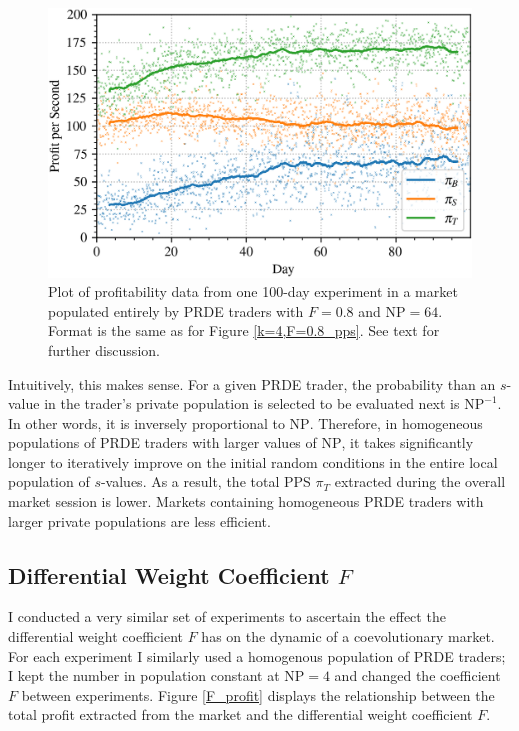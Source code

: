\documentclass[conference]{IEEEtran}
\begin{document}
\begin{figure}[htbp]
    \centerline{\includegraphics[width=\columnwidth]{k=64,F=0.8_pps.png}}
    \caption{
        Plot of profitability data from one 100-day experiment in a market populated entirely by PRDE traders with $F=0.8$ and $\mathrm{NP}=64$.
        Format is the same as for Figure \ref{k=4,F=0.8_pps}.
        See text for further discussion.
    }
    \label{k=64,F=0.8_pps}
\end{figure}

Intuitively, this makes sense.
For a given PRDE trader, the probability than an $s$-value in the trader's private population is selected to be evaluated next is $\mathrm{NP}^{-1}$.
In other words, it is inversely proportional to $\mathrm{NP}$.
Therefore, in homogeneous populations of PRDE traders with larger values of $\mathrm{NP}$, it takes significantly longer to iteratively improve on the initial random conditions in the entire local population of $s$-values.
As a result, the total PPS $\pi_T$ extracted during the overall market session is lower.
Markets containing homogeneous PRDE traders with larger private populations are less efficient.

\subsection{Differential Weight Coefficient $F$}

I conducted a very similar set of experiments to ascertain the effect the differential weight coefficient $F$ has on the dynamic of a coevolutionary market.
For each experiment I similarly used a homogenous population of PRDE traders; I kept the number in population constant at $\mathrm{NP}=4$ and changed the coefficient $F$ between experiments.
Figure \ref{F_profit} displays the relationship between the total profit extracted from the market and the differential weight coefficient $F$.
\end{document}
